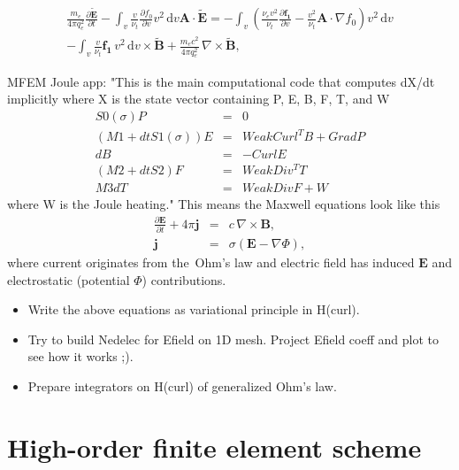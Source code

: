 \documentclass[preprint,12pt]{elsarticle}
\newcommand{\pdv}[2]{\frac{\partial{#1}}{\partial{#2}}}
\newcommand{\vect}[1]{\boldsymbol{#1}}
\newcommand{\matr}[1]{\mathbf{#1}}
\newcommand{\dI}{\text{d}}
\newcommand{\nue}{\nu_{e}}
\newcommand{\nutot}{\nu_{t}}
\newcommand{\vmag}{v}
\newcommand{\E}{\vect{E}}
\newcommand{\B}{\vect{B}}
\newcommand{\tE}{\vect{\tilde{E}}}
\newcommand{\tB}{\vect{\tilde{B}}}
\newcommand{\qe}{q_e}
\newcommand{\me}{m_e}
\newcommand{\fzero}{f_0}
\newcommand{\fone}{\vect{f_1}}
\newcommand{\MA}{\matr{A}}
\newcommand{\intv}{\int_{\vmag}}
\newcounter{bla}
\begin{document}
\begin{multline}
  \frac{\me}{4\pi\qe^2}\pdv{\tE}{t} 
  - \intv\frac{\vmag}{\nutot} \pdv{\fzero}{\vmag}\vmag^2\, \dI\vmag \MA\cdot\tE 
   = 
  - \intv\left( 
  \frac{\nue\vmag^2}{\nutot}\pdv{\fone}{\vmag}
  - \frac{\vmag^2}{\nutot}\MA\cdot\nabla\fzero\right)\vmag^2\, \dI\vmag  \\
  - \intv \frac{\vmag}{\nutot}\fone\, \vmag^2\, \dI\vmag \times\tB
  + \frac{\me c^2}{4\pi\qe^2}\, \nabla\times\tB ,
  \label{eq:GeneralizedOhm} 
\end{multline}

MFEM Joule app:
"This is the main computational code that computes dX/dt implicitly
where X is the state vector containing P, E, B, F, T, and W
\begin{eqnarray}
  S0(\sigma) P &=& 0 \\
  (M1+dt S1(\sigma)) E &=& WeakCurl^T B + Grad P \\
  dB &=& -Curl E \\
  (M2+dt S2) F &=& WeakDiv^T T \\
  M3 dT &=& WeakDiv F + W
\end{eqnarray}
where W is the Joule heating."
This means the Maxwell equations look like this
\begin{eqnarray}
  \pdv{\E}{t} + 4\pi\vect{j} &=& c\, \nabla\times\B , 
  \nonumber \\
  \vect{j} &=& \sigma\left(\E - \nabla\Phi\right) ,
  \nonumber
\end{eqnarray}
where current originates from the~Ohm's law and electric field has induced $\E$ and 
electrostatic (potential $\Phi$) contributions.


\begin{itemize}
  \item Write the above equations as variational principle in H(curl).
  \item Try to build Nedelec for Efield on 1D mesh. Project Efield coeff and plot to see how it works ;).
  \item Prepare integrators on H(curl) of generalized Ohm's law.
\end{itemize}

\section{High-order finite element scheme}\label{sec:hos}
\end{document}
